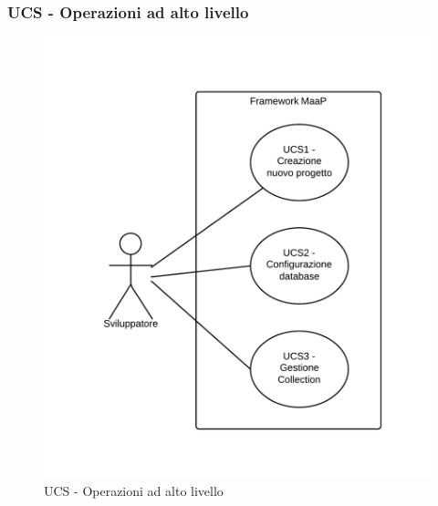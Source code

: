 \subsubsection{UCS - Operazioni ad alto livello} 
    \begin{figure}[H]
      \includegraphics[width=12cm]{UML/UCS - Operazioni ad alto livello.png}
      \caption{UCS - Operazioni ad alto livello} 
    \end{figure}
    
